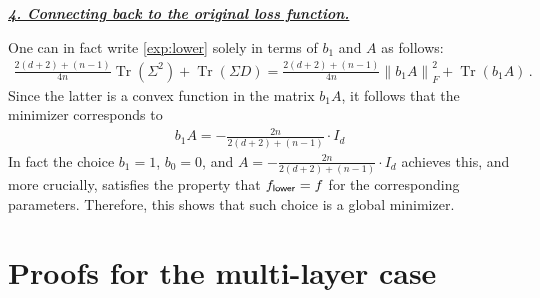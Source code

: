 \documentclass{article}
\newcommand{\bb}{A}
\newcommand{\cc}{b}
\newcommand{\ttf}{f_{\sf lower}}
\newcommand{\emphh}[1]{\textbf{\emph{#1}}}
\DeclareMathOperator{\tr}{Tr}
\newcommand{\norm}[1]{\left\| #1 \right\|}
\begin{document}
 \underline{\emphh{4. Connecting back to the original loss function.}}
 
One can in fact write \eqref{exp:lower} solely in terms of $\cc_1$ and $\bb$ as follows:
\begin{align}
    \frac{2(d+2) + (n-1)}{4n} \tr(\Sigma^2) + \tr(\Sigma D) = \frac{2(d+2) + (n-1)}{4n} \norm{\cc_1\bb}_F^2 + \tr(\cc_1\bb)\,.
\end{align}
Since the latter is a convex function in the matrix $\cc_1\bb$, it follows that the minimizer corresponds to 
\begin{align}
    \cc_1\bb = -\frac{2n}{2(d+2)+(n-1)} \cdot I_d
\end{align}
In fact the choice $\cc_1 = 1$, $\cc_0 =0$, and $\bb =  -\frac{2n}{2(d+2)+(n-1)} \cdot I_d$ achieves this, and more crucially, satisfies the property that $\ttf = f$ for the corresponding parameters. Therefore, this shows that such choice is a global minimizer.


 
 




\section{Proofs for the multi-layer case}
\label{a:foo}
\end{document}
